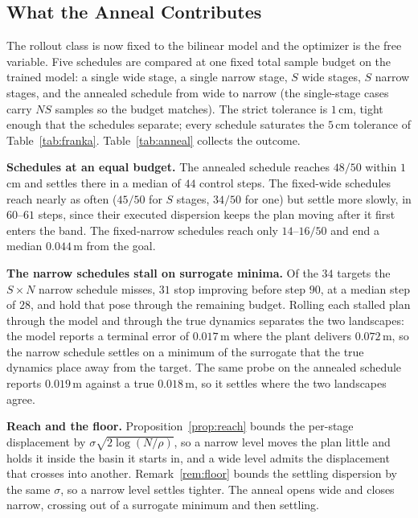\documentclass[letterpaper,10pt,conference]{ieeeconf}
\begin{document}
\subsection{What the Anneal Contributes}\label{subsec:exp_anneal}

The rollout class is now fixed to the bilinear model and the optimizer is the free variable.
Five schedules are compared at one fixed total sample budget on the trained model: a single wide stage, a single narrow stage, $S$ wide stages, $S$ narrow stages, and the annealed schedule from wide to narrow (the single-stage cases carry $NS$ samples so the budget matches).
The strict tolerance is $1$\,cm, tight enough that the schedules separate; every schedule saturates the $5$\,cm tolerance of Table~\ref{tab:franka}.
Table~\ref{tab:anneal} collects the outcome.

\textbf{Schedules at an equal budget.}
The annealed schedule reaches $48/50$ within $1$\,cm and settles there in a median of $44$ control steps.
The fixed-wide schedules reach nearly as often ($45/50$ for $S$ stages, $34/50$ for one) but settle more slowly, in $60$--$61$ steps, since their executed dispersion keeps the plan moving after it first enters the band.
The fixed-narrow schedules reach only $14$--$16/50$ and end a median $0.044$\,m from the goal.

\textbf{The narrow schedules stall on surrogate minima.}
Of the $34$ targets the $S \times N$ narrow schedule misses, $31$ stop improving before step $90$, at a median step of $28$, and hold that pose through the remaining budget.
Rolling each stalled plan through the model and through the true dynamics separates the two landscapes: the model reports a terminal error of $0.017$\,m where the plant delivers $0.072$\,m, so the narrow schedule settles on a minimum of the surrogate that the true dynamics place away from the target.
The same probe on the annealed schedule reports $0.019$\,m against a true $0.018$\,m, so it settles where the two landscapes agree.

\textbf{Reach and the floor.}
Proposition~\ref{prop:reach} bounds the per-stage displacement by $\sigma \sqrt{2 \log(N/\rho)}$, so a narrow level moves the plan little and holds it inside the basin it starts in, and a wide level admits the displacement that crosses into another.
Remark~\ref{rem:floor} bounds the settling dispersion by the same $\sigma$, so a narrow level settles tighter.
The anneal opens wide and closes narrow, crossing out of a surrogate minimum and then settling.
\end{document}
